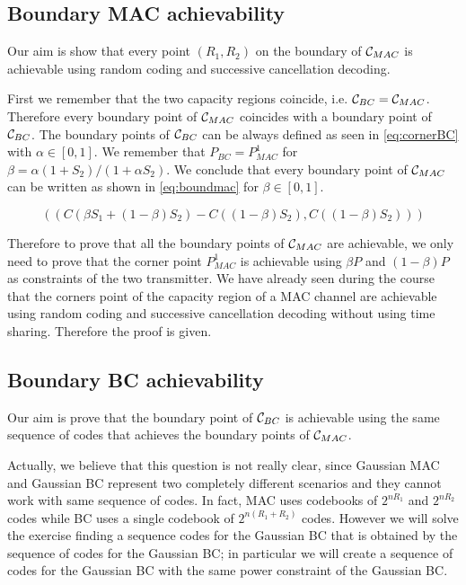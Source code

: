 \subsection{Boundary MAC achievability}

Our aim is show that every point $(R_1,R_2)$ on the boundary of $\mathcal{C}_{MAC}$ is achievable using random coding and successive cancellation decoding.

First we remember that the two capacity regions coincide, i.e. $\mathcal{C}_{BC}=\mathcal{C}_{MAC}$. Therefore every boundary point of $\mathcal{C}_{MAC}$ coincides with a boundary point of $\mathcal{C}_{BC}$. The boundary points of $\mathcal{C}_{BC}$ can be always defined as seen in \eqref{eq:cornerBC} with $\alpha \in [0,1]$. We remember that $P_{BC} = P_{MAC}^1$ for $\beta = \alpha(1+S_2)/(1+\alpha S_2)$. We conclude that every boundary point of $\mathcal{C}_{MAC}$ can be written as shown in \eqref{eq:boundmac} for $\beta \in [0,1]$.

\begin{equation}
	(\left( C (\beta S_1 + (1-\beta)S_2) - C((1-\beta)S_2) , C \left( (1-\beta)S_2 \right) \right))
	\label{eq:boundmac}
\end{equation}

Therefore to prove that all the boundary points of $\mathcal{C}_{MAC}$ are achievable, we only need to prove that the corner point $P_{MAC}^1$ is achievable using $\beta P$ and $(1-\beta) P$ as constraints of the two transmitter. We have already seen during the course that the corners point of the capacity region of a MAC channel are achievable using random coding and successive cancellation decoding without using time sharing. Therefore the proof is given.

\subsection{Boundary BC achievability}

Our aim is prove that the boundary point of $\mathcal{C}_{BC}$ is achievable using the same sequence of codes that achieves the boundary points of $\mathcal{C}_{MAC}$.

Actually, we believe that this question is not really clear, since Gaussian MAC and Gaussian BC represent two completely different scenarios and they cannot work with same sequence of codes. In fact, MAC uses codebooks of $2^{nR_1}$ and $2^{nR_2}$ codes while BC uses a single codebook of $2^{n(R_1+R_2)}$ codes. However we will solve the exercise finding a sequence codes for the Gaussian BC that is obtained by the sequence of codes for the Gaussian BC; in particular we will create a sequence of codes for the Gaussian BC with the same power constraint of the  Gaussian BC.

